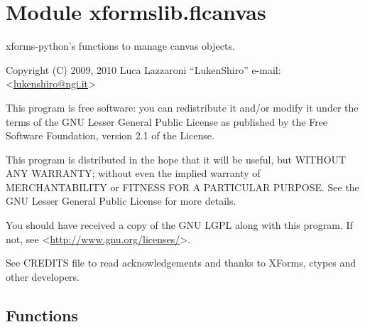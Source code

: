%
%
%


\section{Module xformslib.flcanvas}

    \label{xformslib:flcanvas}

xforms-python's functions to manage canvas objects.

Copyright (C) 2009, 2010  Luca Lazzaroni ``LukenShiro''
e-mail: <\href{mailto:lukenshiro@ngi.it}{lukenshiro@ngi.it}>

This program is free software: you can redistribute it and/or modify
it under the terms of the GNU Lesser General Public License as
published by the Free Software Foundation, version 2.1 of the License.

This program is distributed in the hope that it will be useful,
but WITHOUT ANY WARRANTY; without even the implied warranty of
MERCHANTABILITY or FITNESS FOR A PARTICULAR PURPOSE. See the
GNU Lesser General Public License for more details.

You should have received a copy of the GNU LGPL along with this
program. If not, see <\href{http://www.gnu.org/licenses/}{http://www.gnu.org/licenses/}>.

See CREDITS file to read acknowledgements and thanks to XForms,
ctypes and other developers.


  \subsection{Functions}

    \label{xformslib:flcanvas:fl_create_generic_canvas}

